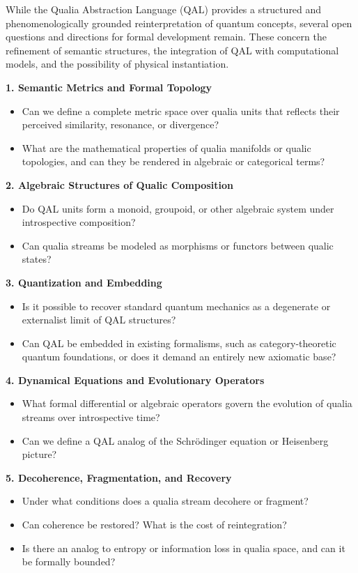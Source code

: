 \documentclass[11pt]{article}
\numberwithin{equation}{section} %
\begin{document}
While the Qualia Abstraction Language (QAL) provides a structured and phenomenologically grounded reinterpretation of quantum concepts, several open questions and directions for formal development remain. These concern the refinement of semantic structures, the integration of QAL with computational models, and the possibility of physical instantiation.

\bigskip

\noindent\textbf{1. Semantic Metrics and Formal Topology}
\begin{itemize}
\item Can we define a complete metric space over qualia units that reflects their perceived similarity, resonance, or divergence?
\item What are the mathematical properties of qualia manifolds or qualic topologies, and can they be rendered in algebraic or categorical terms?
\end{itemize}

\noindent\textbf{2. Algebraic Structures of Qualic Composition}
\begin{itemize}
\item Do QAL units form a monoid, groupoid, or other algebraic system under introspective composition?
\item Can qualia streams be modeled as morphisms or functors between qualic states?
\end{itemize}

\noindent\textbf{3. Quantization and Embedding}
\begin{itemize}
\item Is it possible to recover standard quantum mechanics as a degenerate or externalist limit of QAL structures?
\item Can QAL be embedded in existing formalisms, such as category-theoretic quantum foundations, or does it demand an entirely new axiomatic base?
\end{itemize}

\noindent\textbf{4. Dynamical Equations and Evolutionary Operators}
\begin{itemize}
\item What formal differential or algebraic operators govern the evolution of qualia streams over introspective time?
\item Can we define a QAL analog of the Schrödinger equation or Heisenberg picture?
\end{itemize}

\noindent\textbf{5. Decoherence, Fragmentation, and Recovery}
\begin{itemize}
\item Under what conditions does a qualia stream decohere or fragment?
\item Can coherence be restored? What is the cost of reintegration?
\item Is there an analog to entropy or information loss in qualia space, and can it be formally bounded?
\end{itemize}
\end{document}
